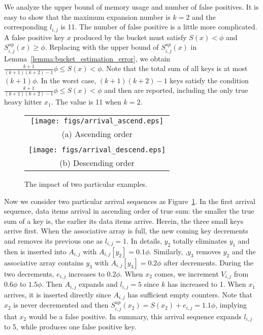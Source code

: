 We analyze the upper bound of memory usage and number of false positives.
It is easy to show that the maximum expansion number is $k=2$ and the corresponding $l_{i,j}$ is 11.
The number of false positive is a little more complicated.
A false positive key $x$ produced by the bucket must satisfy $S(x)<\phi$
and $S^{up}_{i,j}(x) \ge \phi$.
Replacing with the upper bound of $S^{up}_{i,j}(x)$ in Lemma~\ref{lemma:bucket_estimation_error},
we obtain $\frac{k+1}{(k+1)(k+2)-1}\phi \le S(x) <\phi$.
Note that the total sum of all keys is at most $(k+1)\phi$.
In the worst case, $(k+1)(k+2)-1$ keys satisfy the condition $\frac{k+1}{(k+1)(k+2)-1}\phi \le S(x) <\phi$
and then are reported, including the only true heavy hitter $x_1$.
The value is 11 when $k=2$.

\begin{figure}[!t]
\centering
\begin{tabular}{c}
\texttt{[image: figs/arrival\_ascend.eps]} \\
{\small (a) Ascending order} \\
\vspace{3pt}\\
\texttt{[image: figs/arrival\_descend.eps]} \\
{\small (b) Descending order}
\end{tabular}
\caption{The impact of two particular examples.}
\label{fig:seq_example}
\end{figure}

Now we consider two particular arrival sequences as Figure~\ref{fig:seq_example}.
In the first arrival sequence, data items arrival in ascending order of true sum:
the smaller the true sum of a key is, the earlier its data items arrive.
Herein, the three small keys arrive first.
When the associative array is full, the new coming key decrements and removes its previous one as $l_{i,j}=1$.
In details, $y_2$ totally eliminates $y_1$ and then is inserted into $A_{i,j}$ with $A_{i,j}[y_2]=0.1\phi$.
Similarly, ,$y_3$ removes $y_2$ and the associative array contains $y_3$ with $A_{i,j}[y_3]=0.2\phi$ after decrements.
During the two decrements, $e_{i,j}$ increases to $0.2\phi$.
When $x_2$ comes, we increment $V_{i,j}$ from $0.6\phi$ to $1.5\phi$.
Then $A_{i,j}$ expands and $l_{i,j}=5$ since $k$ has increased to 1.
When $x_1$ arrives, it is inserted directly since $A_{i,j}$ has sufficient empty counters.
Note that $x_2$ is never decremented and then $S^{up}_{i,j}(x_2)=S(x_2)+e_{i,j}=1.1\phi$,
implying that $x_2$ would be a false positive.
In summary, this arrival sequence expands $l_{i,j}$ to 5,
while produces one false positive key.

